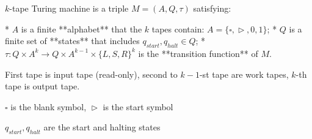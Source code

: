 $k$-tape Turing machine is a triple $M = (A,Q,τ)$ satisfying:

*  $A$ is a finite **alphabet** that the $k$ tapes contain:
   $A = \lbrace{\square, \vartriangleright, 0, 1}\rbrace$;
*  $Q$ is a finite set of **states** that includes $q_{start}, q_{halt} ∈ Q$;
*  $τ: Q × A^k → Q × A^{k−1} × \lbrace{L,S,R}\rbrace^k$ is the
   **transition function** of $M$.
   
First tape is input tape (read-only), second to $k-1$-st tape are work tapes, $k$-th tape is output tape.

$\square$ is the blank symbol, $\vartriangleright$ is the start symbol

$q_{start}, q_{halt}$ are the start and halting states
